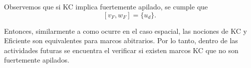 \documentclass[12pt]{article}
\begin{document}
Observemos que si KC implica fuertemente apilado, se cumple que 
\[
[v_F, w_F]=\{u_d\}.
\]

Entonces, similarmente a como ocurre en el caso espacial, las nociones de KC y Eficiente son equivalentes para marcos abitrarios. Por lo tanto, dentro de las actividades 
futuras se encuentra el verificar si existen marcos KC que no son fuertemente apilados.

%


\end{document}
